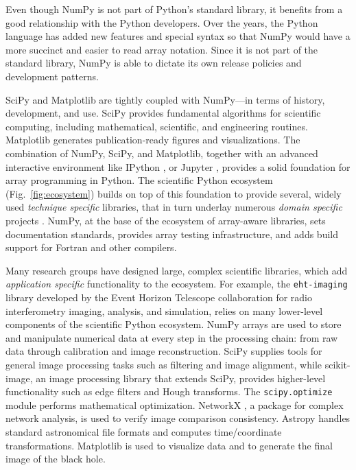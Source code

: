 Even though NumPy is not part of Python's standard library,
it benefits from a good relationship with the Python developers.
Over the years, the Python language has added new features and
special syntax so that NumPy would have a more succinct and 
easier to read array notation.
Since it is not part of the standard library, NumPy is able to
dictate its own release policies and development patterns.

SciPy and Matplotlib are tightly coupled with NumPy---in terms of
history, development, and use.
SciPy provides fundamental algorithms for scientific computing,
including mathematical, scientific, and engineering routines.
Matplotlib generates publication-ready figures and visualizations.
The combination of NumPy, SciPy, and Matplotlib, together with
an advanced interactive environment like IPython \cite{perez2007ipython},
or Jupyter \cite{Kluyver:2016aa}, provides a solid foundation for array
programming in Python.
The scientific Python ecosystem (Fig.~\ref{fig:ecosystem}) builds on top of
this foundation to provide several, widely used \emph{technique specific}
libraries\cite{pedregosa2011scikit,vanderwalt2014scikit,SciPyProceedings_11},
that in turn underlay numerous \emph{domain specific} projects
\cite{astropy:2013,astropy:2018,cock2009biopython,millman2007analysis,sunpy2015,2018EGUGA..2012146H}.
NumPy, at the base of the ecosystem of array-aware libraries,
sets documentation standards, provides array testing infrastructure,
and adds build support for Fortran and other compilers.

Many research groups have designed large,
complex scientific libraries, which add \emph{application specific} functionality
to the ecosystem.
For example, the \texttt{eht-imaging} library \cite{chael2019ehtim} developed by
the Event Horizon Telescope collaboration for radio interferometry imaging,
analysis, and simulation, relies on many lower-level components of the scientific Python
ecosystem.
NumPy arrays are used to store and manipulate numerical data at every step
in the processing chain: from raw data through calibration and image
reconstruction.
SciPy supplies tools for general image processing tasks such as
filtering and image alignment, while scikit-image, an image processing
library that extends SciPy, provides higher-level functionality such as
edge filters and Hough transforms.
The \texttt{scipy.optimize} module performs mathematical optimization.
NetworkX \cite{SciPyProceedings_11}, a package for complex
network analysis, is used to verify image comparison consistency.
Astropy \cite{astropy:2013, astropy:2018} handles standard
astronomical file formats and computes time/coordinate transformations.
Matplotlib is used to visualize data and to generate the final image of the black hole.

